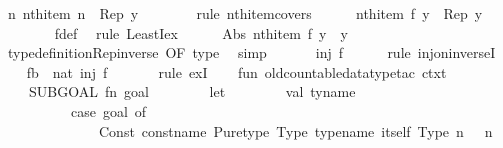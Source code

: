 \begin{isabellebody}
\ {\isachardoublequoteopen}{\isasymexists}n{\isachardot}\ nth{\isacharunderscore}item\ n\ {\isacharequal}\ Rep\ y{\isachardoublequoteclose}\isanewline
\ \ \ \ \ \ \isamarkupfalse%
\ {\isacharparenleft}rule\ nth{\isacharunderscore}item{\isacharunderscore}covers{\isacharparenright}\isanewline
\ \ \ \ \isamarkupfalse%
\ {\isachardoublequoteopen}nth{\isacharunderscore}item\ {\isacharparenleft}f\ y{\isacharparenright}\ {\isacharequal}\ Rep\ y{\isachardoublequoteclose}\isanewline
\ \ \ \ \ \ \isamarkupfalse%
\ f{\isacharunderscore}def\ \isamarkupfalse%
\ {\isacharparenleft}rule\ LeastI{\isacharunderscore}ex{\isacharparenright}\isanewline
\ \ \ \ \isamarkupfalse%
\ {\isachardoublequoteopen}Abs\ {\isacharparenleft}nth{\isacharunderscore}item\ {\isacharparenleft}f\ y{\isacharparenright}{\isacharparenright}\ {\isacharequal}\ y{\isachardoublequoteclose}\isanewline
\ \ \ \ \ \ \isamarkupfalse%
\ type{\isacharunderscore}definition{\isachardot}Rep{\isacharunderscore}inverse\ {\isacharbrackleft}OF\ type{\isacharbrackright}\ \isamarkupfalse%
\ simp\isanewline
\ \ \isacommand{{\isacharbraceright}}\isamarkupfalse%
\isanewline
\ \ \isamarkupfalse%
\ {\isachardoublequoteopen}inj\ f{\isachardoublequoteclose}\isanewline
\ \ \ \ \isamarkupfalse%
\ {\isacharparenleft}rule\ inj{\isacharunderscore}on{\isacharunderscore}inverseI{\isacharparenright}\isanewline
\ \ \isamarkupfalse%
\ {\isachardoublequoteopen}{\isasymexists}f{\isacharcolon}{\isacharcolon}{\isacharprime}b\ {\isasymRightarrow}\ nat{\isachardot}\ inj\ f{\isachardoublequoteclose}\isanewline
\ \ \ \ \isamarkupfalse%
\ {\isacharminus}\ {\isacharparenleft}rule\ exI{\isacharparenright}\isanewline
{}\isamarkupfalse%
%
\endisatagproof
{\isafoldproof}%
%
\isadelimproof
\isanewline
%
\endisadelimproof
%
\isadelimML
\isanewline
%
\endisadelimML
%
\isatagML
{}\isamarkupfalse%
\ {\isacartoucheopen}\isanewline
\ \ fun\ old{\isacharunderscore}countable{\isacharunderscore}datatype{\isacharunderscore}tac\ ctxt\ {\isacharequal}\isanewline
\ \ \ \ SUBGOAL\ {\isacharparenleft}fn\ {\isacharparenleft}goal{\isacharcomma}\ {\isacharunderscore}{\isacharparenright}\ {\isacharequal}{\isachargreater}\isanewline
\ \ \ \ \ \ let\isanewline
\ \ \ \ \ \ \ \ val\ ty{\isacharunderscore}name\ {\isacharequal}\isanewline
\ \ \ \ \ \ \ \ \ \ {\isacharparenleft}case\ goal\ of\isanewline
\ \ \ \ \ \ \ \ \ \ \ \ {\isacharparenleft}{\isacharunderscore}\ {\isachardollar}\ Const\ {\isacharparenleft}{\isacharat}{\isacharbraceleft}const{\isacharunderscore}name\ Pure{\isachardot}type{\isacharbraceright}{\isacharcomma}\ Type\ {\isacharparenleft}{\isacharat}{\isacharbraceleft}type{\isacharunderscore}name\ itself{\isacharbraceright}{\isacharcomma}\ {\isacharbrackleft}Type\ {\isacharparenleft}n{\isacharcomma}\ {\isacharunderscore}{\isacharparenright}{\isacharbrackright}{\isacharparenright}{\isacharparenright}{\isacharparenright}\ {\isacharequal}{\isachargreater}\ n\isanewline

\end{isabellebody}
